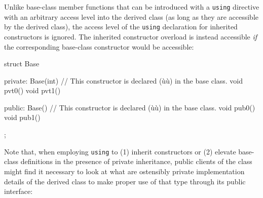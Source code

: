Unlike base-class member functions that can be introduced with a
\lstinline!using! directive with an arbitrary access level into the derived
class (as long as they are accessible by the derived class), the access
level of the \lstinline!using! declaration for inherited constructors is
ignored. The inherited constructor overload is instead
accessible \emph{if} the corresponding base-class constructor would be
accessible:

\begin{emcppslisting}[emcppsbatch=e13]
struct Base
{
private:
    Base(int) { }  // This constructor is declared (ù{}ù) in the base class.
    void pvt0() { }
    void pvt1() { }

public:
    Base() { }     // This constructor is declared (ù{}ù) in the base class.
    void pub0() { }
    void pub1() { }
};
\end{emcppslisting}
    
\noindent Note that, when employing \lstinline!using! to (1) inherit constructors or
(2) elevate base-class definitions in the presence of private
inheritance, public clients of the class might find it necessary 
to look at what are ostensibly private implementation details of the
derived class to make proper use of that type through its
public interface:

